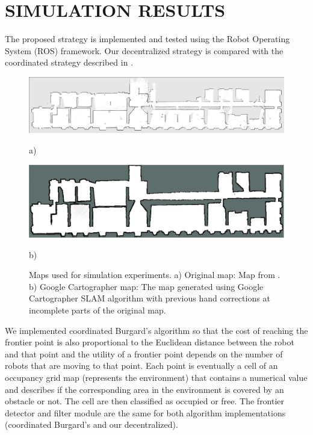 \section{SIMULATION RESULTS}

The proposed strategy is implemented and tested using the Robot Operating System (ROS) framework. Our decentralized strategy is compared with the coordinated strategy described in \cite{Burgard2005}. %

\begin{figure}[b]
    \centering
	\begin{minipage}{1.0\columnwidth}
	   \centering
	   \includegraphics[width=\columnwidth]{./Pictures/belgioioso.pdf}
	   \caption*{a)} 
	\end{minipage}
\hfill 	
	\begin{minipage}{1.0\columnwidth}
	   \centering
	   \includegraphics[width=\columnwidth]{./Pictures/map.pdf}
	   \caption*{b)} 
	\end{minipage}
\caption{Maps used for simulation experiments. a) Original map: Map from \cite{fr_dataset}. b) Google Cartographer map: The map generated using Google Cartographer SLAM algorithm with previous hand corrections at incomplete parts of the original map.}
\label{scenario}
\end{figure}
We implemented coordinated Burgard's algorithm so that the cost of reaching the frontier point is also proportional to the Euclidean distance between the robot and that point and the utility of a frontier point depends on the number of robots that are moving to that point. Each point is eventually a cell of an occupancy grid map (represents the environment) that contains a numerical value and describes if the corresponding area in the environment is covered by an obstacle or not. The cell are then classified as occupied or free. The frontier detector and filter module are the same for both algorithm implementations (coordinated Burgard's and our decentralized). 


